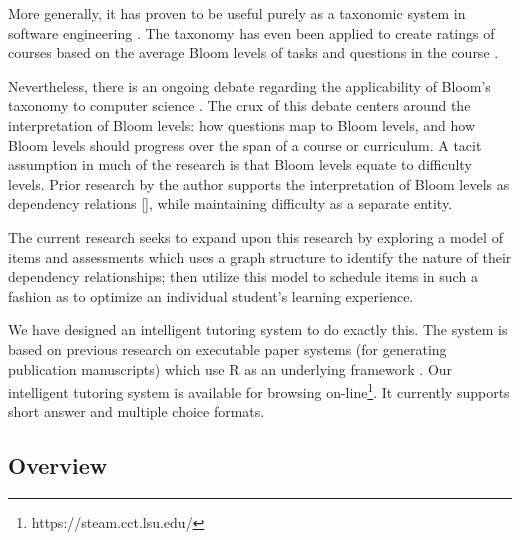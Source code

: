 \documentclass{article}
\begin{document}
More generally, it has proven to be useful purely as a taxonomic system in
software engineering \cite{britto2015} \cite{mahmood2014}.  The taxonomy has
even been applied to create ratings of courses based on the average Bloom
levels of tasks and questions in the course \cite{oliver2004course}.

Nevertheless, there is an ongoing debate regarding the applicability of Bloom's
taxonomy to computer science \cite{johnson2006bloom}
\cite{fuller2007developing} \cite{thompson2008bloom}.  The crux of this debate
centers around the interpretation of Bloom levels: how questions map to Bloom
levels, and how Bloom levels should progress over the span of a course or
curriculum.  A tacit assumption in much of the research is that Bloom levels
equate to difficulty levels.  Prior research by the author supports the
interpretation of Bloom levels as dependency relations [], while maintaining
difficulty as a separate entity.  %

The current research seeks to expand upon this research by exploring a model of
items and assessments which uses a graph structure to identify the nature of
their dependency relationships; then utilize this model to schedule items in
such a fashion as to optimize an individual student's learning experience.

We have designed an intelligent tutoring system to do exactly this.  The system
is based on previous research on executable paper systems (for generating
publication manuscripts) which use R as an underlying framework
\cite{castleberry2011}.  Our intelligent tutoring system is available for
browsing on-line\footnote{https://steam.cct.lsu.edu/}. It currently supports
short answer and multiple choice formats.

\subsection{Overview}
\end{document}
